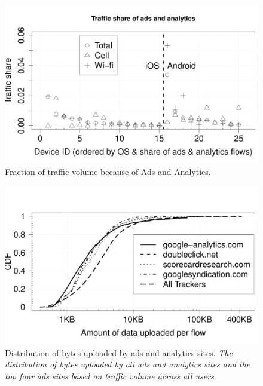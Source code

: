 \begin{figure}[t]
\includegraphics[width=\columnwidth]{plots/ad_share_bytes.pdf}
\caption{Fraction of traffic volume because of Ads and Analytics. \emph{}}
\label{fig:description}
\end{figure}

\begin{figure}[t]
\includegraphics[width=\columnwidth]{plots/distrib_ad_uploads.pdf}
\caption{Distribution of bytes uploaded by ads and analytics sites. \emph{The distribution of bytes uploaded by all ads and analytics sites and the top four ads sites based on traffic volume across all users}.}
\label{fig:description}
\end{figure}

